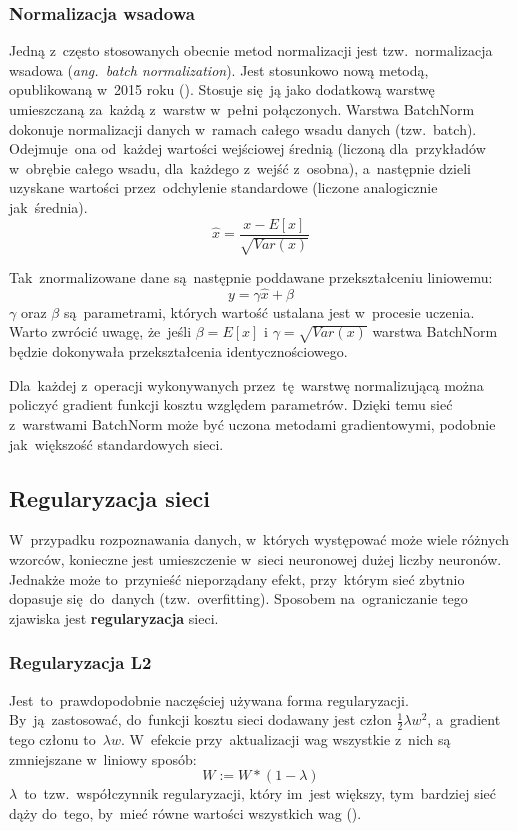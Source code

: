 \subsubsection{Normalizacja wsadowa}
Jedną z~często stosowanych obecnie metod normalizacji jest tzw.~normalizacja wsadowa (\textit{ang.~batch normalization}).
Jest stosunkowo nową metodą, opublikowaną w~2015 roku (\cite{batch-norm}). Stosuje się~ją jako
dodatkową warstwę umieszczaną za~każdą z~warstw w~pełni połączonych. Warstwa BatchNorm dokonuje normalizacji danych
w~ramach całego wsadu danych (tzw.~batch). Odejmuje~ona od~każdej wartości wejściowej średnią (liczoną dla~przykładów
w~obrębie całego wsadu, dla~każdego z~wejść z~osobna), a~następnie dzieli uzyskane wartości przez~odchylenie standardowe
(liczone analogicznie jak~średnia).
\begin{equation*}
 \widehat{x} = \frac{x - E[x]}{\sqrt{Var(x)}}
\end{equation*}

Tak~znormalizowane dane są~następnie poddawane przekształceniu liniowemu:
\begin{equation*}
y = \gamma\widehat{x} + \beta
\end{equation*}
$\gamma$ oraz $\beta$ są~parametrami, których wartość ustalana jest w~procesie uczenia. Warto zwrócić uwagę, że~jeśli
$\beta=E[x]$ i $\gamma=\sqrt{Var(x)}$ warstwa BatchNorm będzie dokonywała przekształcenia identycznościowego.

Dla~każdej z~operacji wykonywanych przez~tę~warstwę normalizującą można policzyć gradient funkcji kosztu względem
parametrów. Dzięki temu sieć z~warstwami BatchNorm może być uczona metodami gradientowymi, podobnie jak~większość
standardowych sieci.

\subsection{Regularyzacja sieci}
W~przypadku rozpoznawania danych, w~których występować może wiele różnych wzorców, konieczne jest umieszczenie w~sieci
neuronowej dużej liczby neuronów. Jednakże może to~przynieść nieporządany efekt, przy~którym sieć zbytnio dopasuje
się~do~danych (tzw.~overfitting). Sposobem na~ograniczanie tego zjawiska jest \textbf{regularyzacja} sieci.

\subsubsection{Regularyzacja L2} \label{sssec:reg_L2}
Jest~to~prawdopodobnie naczęściej używana forma regularyzacji. By~ją~zastosować, do~funkcji kosztu sieci dodawany
jest człon $\frac{1}{2}\lambda w^2$, a~gradient tego członu to~$\lambda w$. W~efekcie przy~aktualizacji wag wszystkie
z~nich są zmniejszane w~liniowy sposób:
\begin{equation*}
W := W*(1 -\lambda)
\end{equation*}
$\lambda$~to~tzw.~współczynnik regularyzacji, który im~jest większy, tym~bardziej sieć dąży do~tego,
by~mieć równe wartości wszystkich wag (\cite{L2-regularization}).

